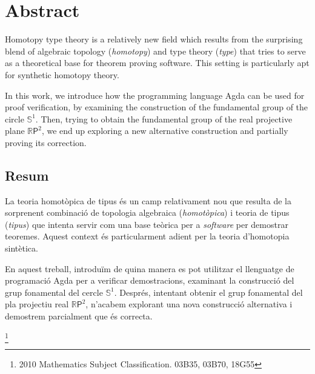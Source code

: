 \section*{Abstract}

Homotopy type theory is a relatively new field which results from the surprising blend of algebraic topology (\textit{homotopy}) and type theory (\textit{type}) that tries to serve as a theoretical base for theorem proving software.
This setting is particularly apt for synthetic homotopy theory.

In this work, we introduce how the programming language Agda can be used for proof verification, by examining the construction of the fundamental group of the circle $\mathbb{S}^{1}$.
Then, trying to obtain the fundamental group of the real projective plane $\mathbb{R}\mathsf{P}^2$, we end up exploring a new alternative construction and partially proving its correction.

\begin{otherlanguage}{catalan}
\section*{Resum}

La teoria homotòpica de tipus és un camp relativament nou que resulta de la sorprenent combinació de topologia algebraica (\textit{homotòpica}) i teoria de tipus (\textit{tipus}) que intenta servir com una base teòrica per a \textit{software} per demostrar teoremes.
Aquest context és particularment adient per la teoria d'homotopia sintètica.

En aquest treball, introduïm de quina manera es pot utilitzar el llenguatge de programació Agda per a verificar demostracions, examinant la construcció del grup fonamental del cercle $\mathbb{S}^{1}$.
Després, intentant obtenir el grup fonamental del pla projectiu real $\mathbb{R}\mathsf{P}^2$, n'acabem explorant una nova construcció alternativa i demostrem parcialment que és correcta.
\end{otherlanguage}

{\let\thefootnote\relax\footnote{2010 Mathematics Subject Classification. 03B35, 03B70, 18G55}}
